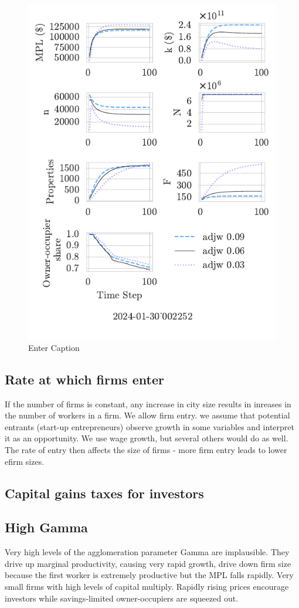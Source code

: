 \documentclass{article}
\begin{document}
 \begin{figure}
     \centering
     \includegraphics[width=0.5\linewidth]{adjw-2024-01-30_002252.pdf}
     \caption{Enter Caption}
     \label{fig:enter-label}
 \end{figure}


 
\newpage %
\subsection{Rate at which firms enter}
If  the number of firms is constant,  any increase in city size results in inreases in the number of workers in a firm. We allow firm entry. we assume that potential entrants (start-up entrepreneurs) observe growth in some variables and interpret it as an opportunity. We use wage growth, but several others would do as well. The rate of entry then affects the size of firms - more firm entry leads to lower efirm sizes.

 
\newpage %
\subsection{Capital gains taxes for investors}

\newpage %

\subsection{High Gamma}
Very high levels of the agglomeration parameter Gamma are implausible. They drive up marginal productivity, causing very rapid growth, drive down firm size because the first worker is extremely productive but the MPL falls rapidly. Very small firms with high levels of capital multiply. Rapidly rising prices encourage investors while savings-limited owner-occupiers are squeezed out.
\end{document}
